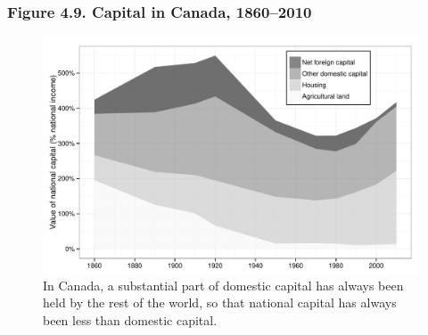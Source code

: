 \documentclass[t]{beamer}\usepackage[]{graphicx}\usepackage[]{color}
\newenvironment{knitrout}{}{} %
\begin{document}
\begin{frame}[label=Figure_4_9]
\frametitle{Figure 4.9. Capital in Canada, 1860--2010}
\begin{figure}[t]
\begin{minipage}[b]{\textwidth}
\centering
\begin{knitrout}\footnotesize
{}\color{fgcolor}

{\centering \includegraphics[width=1\linewidth]{figures/bw/Figure_4_9} 

}



\end{knitrout}
\caption{In Canada, a substantial part of domestic capital has always been held by the rest of the world, so that national capital has always been less than domestic capital.}
\end{minipage}
\end{figure}
\end{frame}
\end{document}
